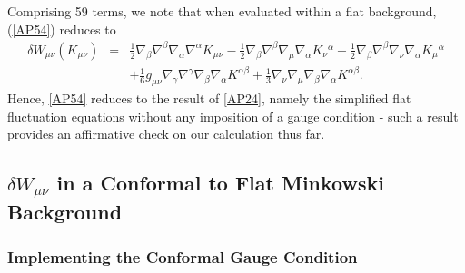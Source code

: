 Comprising 59 terms, we note that when evaluated within a flat background, (\ref{AP54}) reduces to 
\begin{eqnarray}
\delta W_{\mu\nu}^{}(K_{\mu\nu})&=&\tfrac{1}{2} \nabla_{\beta}\nabla^{\beta}\nabla_{\alpha}\nabla^{\alpha}K_{\mu \nu} -  \tfrac{1}{2} \nabla_{\beta}\nabla^{\beta}\nabla_{\mu}\nabla_{\alpha}K_{\nu}{}^{\alpha} -  \tfrac{1}{2} \nabla_{\beta}\nabla^{\beta}\nabla_{\nu}\nabla_{\alpha}K_{\mu}{}^{\alpha}  
\nonumber\\
&&+ \tfrac{1}{6} g_{\mu \nu} \nabla_{\gamma}\nabla^{\gamma}\nabla_{\beta}\nabla_{\alpha}K^{\alpha \beta}+ \tfrac{1}{3} \nabla_{\nu}\nabla_{\mu}\nabla_{\beta}\nabla_{\alpha}K^{\alpha \beta}.
\end{eqnarray}
Hence, \eqref{AP54} reduces to the result of \eqref{AP24}, namely the simplified flat fluctuation equations without any imposition of a gauge condition - such a result provides an affirmative check on our calculation thus far.


\subsection{$\delta W_{\mu\nu}$ in a Conformal to Flat Minkowski Background}
\label{ss:fluctuations_around_conformal_flat_cgauge}

\subsubsection{Implementing the Conformal Gauge Condition}
\label{sss:implementing_cgauge}

